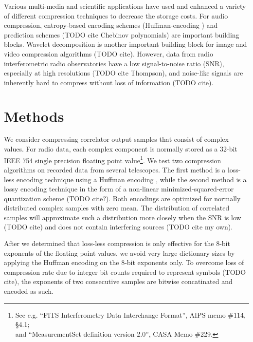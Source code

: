 \documentclass{article}
\begin{document}
Various multi-media and scientific applications have used and enhanced a variety of different compression techniques to decrease the storage costs. For audio compression, entropy-based encoding schemes (Huffman-encoding \cite{huffman}) and prediction schemes (TODO cite Chebinov polynomials) are important building blocks. Wavelet decomposition is another important building block for image and video compression algorithms (TODO cite). However, data from radio interferometric radio observatories have a low signal-to-noise ratio (SNR), especially at high resolutions (TODO cite Thompson), and noise-like signals are inherently hard to compress without loss of information (TODO cite).



\section{Methods}
We consider compressing correlator output samples that consist of complex values. For radio data, each complex component is normally stored as a 32-bit IEEE 754 single precision floating point value\footnote{See e.g. ``FITS Interferometry Data Interchange Format'', AIPS memo \#114, \S4.1;\\and ``MeasurementSet definition version 2.0'', CASA Memo \#229.}. We test two compression algorithms on recorded data from several telescopes. The first method is a loss-less encoding technique using a Huffman encoding \cite{huffman}, while the second method is a lossy encoding technique in the form of a non-linear minimized-squared-error quantization scheme (TODO cite?). Both encodings are optimized for normally distributed complex samples with zero mean. The distribution of correlated samples will approximate such a distribution more closely when the SNR is low (TODO cite) and does not contain interfering sources (TODO cite my own).

After we determined that loss-less compression is only effective for the 8-bit exponents of the floating point values, we avoid very large dictionary sizes by applying the Huffman encoding on the 8-bit exponents only. To overcome loss of compression rate due to integer bit counts required to represent symbols (TODO cite), the exponents of two consecutive samples are bitwise concatinated and encoded as such.
\end{document}

